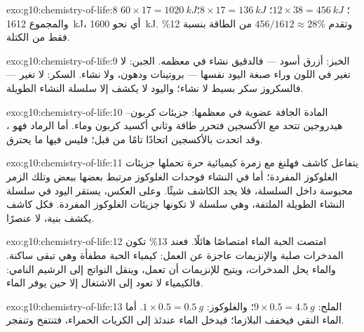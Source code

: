 \begin{solution}{exo:g10:chemistry-of-life:8}
 $60 \times 17 = \qty{1020}{kJ}$؛  $12 \times 38 =
\qty{456}{kJ}$؛  $8 \times 17 = \qty{136}{kJ}$؛ والمجموع
\qty{1612}{kJ}، أي نحو \qty{1600}{kJ}. وتقدم  $456/1612 \approx
28\%$ من الطاقة بنسبة 12\% فقط من الكتلة.
\end{solution}

\begin{solution}{exo:g10:chemistry-of-life:9}
الخبز: أزرق أسود --- فالدقيق نشاء في معظمه. الجبن: لا تغير في اللون
وراء صبغة اليود نفسها --- بروتينات ودهون، ولا نشاء. السكر: لا تغير
--- فالسكروز سكر بسيط لا نشاء؛ واليود لا يكشف إلا سلسلة النشاء
الطويلة.
\end{solution}

\begin{solution}{exo:g10:chemistry-of-life:10}
المادة الجافة عضوية في معظمها: جزيئات كربون--هيدروجين تتحد مع
الأكسجين فتحرر طاقة وثاني أكسيد كربون وماء. أما الرماد فهو ، وقد اتحدت بالأكسجين اتحادًا تامًا من قبل؛ فليس فيها ما
يحترق.
\end{solution}

\begin{solution}{exo:g10:chemistry-of-life:11}
يتفاعل كاشف فهلنغ مع زمرة كيميائية حرة تحملها جزيئات الغلوكوز
المفردة؛ أما في النشاء فوحدات الغلوكوز مرتبط بعضها ببعض وتلك الزمر
محبوسة داخل السلسلة، فلا يجد الكاشف شيئًا. وعلى العكس، يستقر اليود في
سلسلة النشاء الطويلة الملتفة، وهي سلسلة لا تكونها جزيئات الغلوكوز
المفردة. فكل كاشف يكشف بنية، لا عنصرًا.
\end{solution}

\begin{solution}{exo:g10:chemistry-of-life:12}
امتصت الحبة الماء امتصاصًا هائلًا. فعند 13\% تكون المدخرات صلبة
والإنزيمات عاجزة عن العمل: كيمياء الحبة مطفأة وهي تبقى ساكنة. والماء
يحل المدخرات، ويتيح للإنزيمات أن تعمل، وينقل النواتج إلى الرشيم
النامي: فالكيمياء لا تعود إلى الاشتغال إلا حين يوفر الماء.
\end{solution}

\begin{solution}{exo:g10:chemistry-of-life:13}
الملح: $9 \times 0.5 = \qty{4.5}{g}$؛ والغلوكوز: $1 \times 0.5 =
\qty{0.5}{g}$. أما الماء النقي فيخفف البلازما؛ فيدخل الماء عندئذ إلى
الكريات الحمراء، فتنتفخ وتنفجر.
\end{solution}

